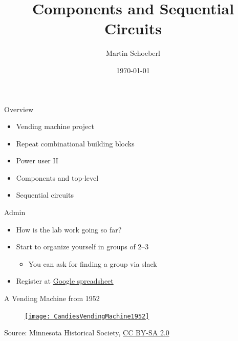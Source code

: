 

\newif\ifbook



\title{Components and Sequential Circuits}
\author{Martin Schoeberl}
\date{\today}



\begin{frame}
\titlepage
\end{frame}

\begin{frame}[fragile]{Overview}
\begin{itemize}
\item Vending machine project
\item Repeat combinational building blocks
\item Power user II
\item Components and top-level
\item Sequential circuits
\end{itemize}
\end{frame}


\begin{frame}[fragile]{Admin}
\begin{itemize}
\item How is the lab work going so far?
\item Start to organize yourself in groups of 2--3
\begin{itemize}
\item You can ask for finding a group via slack
\end{itemize}
\item Register at \href{https://docs.google.com/spreadsheets/d/1Hp81EyFYYvjm336DrwtCym9oRQUEzRKe6VceFp0ZCAQ/edit?usp=sharing}{Google spreadsheet}
\end{itemize}
\end{frame}


\begin{frame}[fragile]{A Vending Machine from 1952}
\begin{figure}
    \centering
    \href{https://en.wikipedia.org/wiki/File:CandiesVendingMachine1952.jpg}{\texttt{[image: CandiesVendingMachine1952]}}

\end{figure}

{\tiny Source: Minnesota Historical Society, \href{https://creativecommons.org/licenses/by-sa/2.0}{CC BY-SA 2.0}}
\end{frame}


